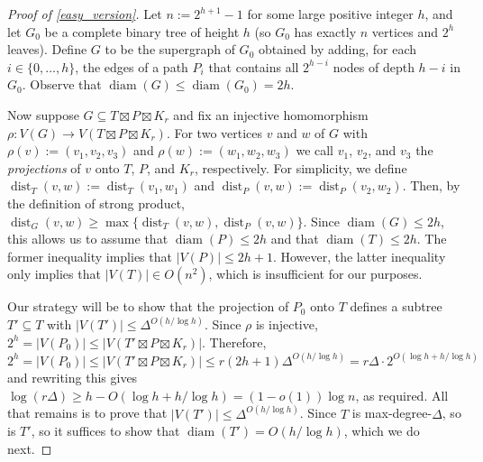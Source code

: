 \documentclass{patmorin}
\newcommand{\defin}[1]{\emph{\color{brightmaroon}#1}}
\DeclareMathOperator{\dist}{dist}
\DeclareMathOperator{\diam}{diam}
\begin{document}
\begin{proof}[Proof of \cref{easy_version}]
  Let $n:=2^{h+1}-1$ for some large positive integer $h$, and let $G_0$ be a complete binary tree of height $h$ (so $G_0$ has exactly $n$ vertices and $2^h$ leaves).  Define $G$ to be the supergraph of $G_0$ obtained by adding, for each $i\in\{0,\ldots,h\}$, the edges of a path $P_i$ that contains all $2^{h-i}$ nodes of depth $h-i$ in $G_0$.  Observe that $\diam(G)\le\diam(G_0)=2h$.

  Now suppose $G\subseteq T\boxtimes P\boxtimes K_r$ and fix an injective homomorphism $\rho:V(G)\to V(T\boxtimes P\boxtimes K_r)$.  For two vertices $v$ and $w$ of $G$ with $\rho(v):=(v_1,v_2,v_3)$ and $\rho(w):=(w_1,w_2,w_3)$ we call $v_1$, $v_2$, and $v_3$ the \defin{projections} of $v$ onto $T$, $P$, and $K_r$, respectively.  For simplicity, we define $\dist_T(v,w):=\dist_T(v_1,w_1)$ and $\dist_P(v,w):=\dist_P(v_2,w_2)$.  Then, by the definition of strong product, $\dist_G(v,w)\ge \max\{\dist_T(v,w),\dist_P(v,w)\}$.  Since $\diam(G)\le 2h$, this allows us to assume that $\diam(P)\le 2h$ and that $\diam(T)\le 2h$.  The former inequality implies that $|V(P)|\le 2h+1$.  However, the latter inequality only implies that $|V(T)|\in O(n^2)$, which is insufficient for our purposes.

  Our strategy will be to show that the projection of $P_0$ onto $T$ defines a subtree $T'\subseteq T$ with $|V(T')|\le \Delta^{O(h/\log h)}$.  Since $\rho$ is injective, $2^h=|V(P_0)|\le |V(T'\boxtimes P\boxtimes K_r)|$. Therefore,
  \[
    2^h = |V(P_0)| \le |V(T'\boxtimes P\boxtimes K_r)| \le r(2h+1)\Delta^{O(h/\log h)} = r\Delta\cdot 2^{O(\log h + h/\log h)}
  \]
  and rewriting this gives $\log(r\Delta) \ge h-O(\log h+h/\log h)=(1-o(1))\log n$, as required.  All that remains is to prove that $|V(T')|\le\Delta^{O(h/\log h)}$.  Since $T$ is max-degree-$\Delta$, so is $T'$, so it suffices to show that $\diam(T')=O(h/\log h)$, which we do next.


\end{proof}
\end{document}
